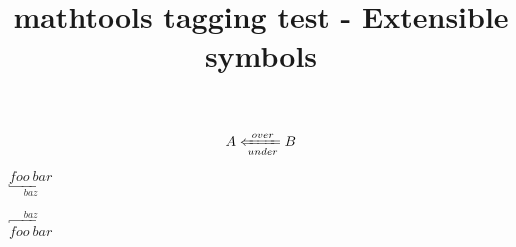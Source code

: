\documentclass{article}
\title{mathtools tagging test - Extensible symbols}
\begin{document}
\[
A \xLeftarrow[under]{over} B
\]

$\underbracket{foo\ bar}_{baz}$

$\overbracket{foo\ bar}^{baz}$
\end{document}
